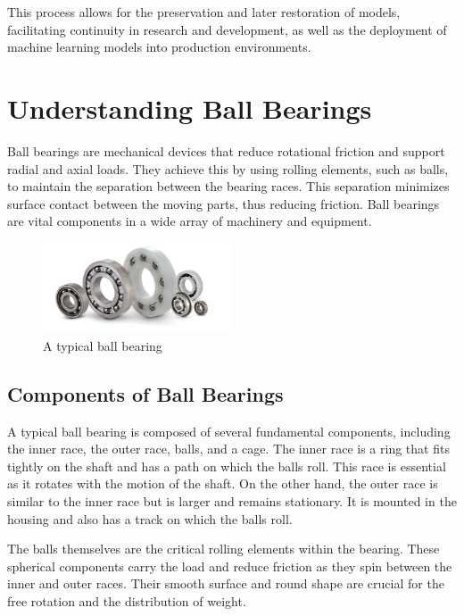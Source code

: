 This process allows for the preservation and later restoration of models, facilitating continuity in research and development, as well as the deployment of machine learning models into production environments.


\section{Understanding Ball Bearings}

Ball bearings are mechanical devices that reduce rotational friction and support radial and axial loads. They achieve this by using rolling elements, such as balls, to maintain the separation between the bearing races. This separation minimizes surface contact between the moving parts, thus reducing friction. Ball bearings are vital components in a wide array of machinery and equipment.

\begin{figure}[h]
    \centering
    \includegraphics[width=0.5\textwidth]{assets/ball-bearings.jpg}
    \caption{A typical ball bearing}
    \label{fig:ball_bearing}
\end{figure}

\subsection{Components of Ball Bearings}

A typical ball bearing is composed of several fundamental components, including the inner race, the outer race, balls, and a cage. The inner race is a ring that fits tightly on the shaft and has a path on which the balls roll. This race is essential as it rotates with the motion of the shaft. On the other hand, the outer race is similar to the inner race but is larger and remains stationary. It is mounted in the housing and also has a track on which the balls roll. 

The balls themselves are the critical rolling elements within the bearing. These spherical components carry the load and reduce friction as they spin between the inner and outer races. Their smooth surface and round shape are crucial for the free rotation and the distribution of weight.

